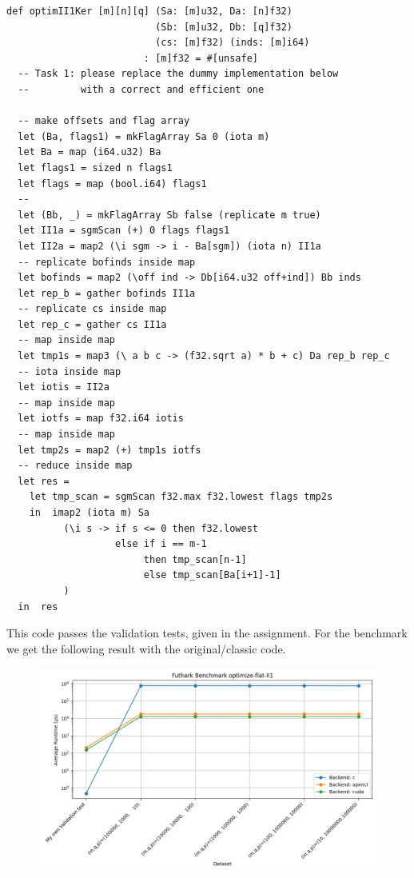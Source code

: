 \documentclass[a4paper,12pt]{article}
\begin{document}
\begin{lstlisting}
def optimII1Ker [m][n][q] (Sa: [m]u32, Da: [n]f32)
                          (Sb: [m]u32, Db: [q]f32)
                          (cs: [m]f32) (inds: [m]i64)
                        : [m]f32 = #[unsafe]
  -- Task 1: please replace the dummy implementation below
  --         with a correct and efficient one

  -- make offsets and flag array
  let (Ba, flags1) = mkFlagArray Sa 0 (iota m)
  let Ba = map (i64.u32) Ba
  let flags1 = sized n flags1
  let flags = map (bool.i64) flags1
  --
  let (Bb, _) = mkFlagArray Sb false (replicate m true)
  let II1a = sgmScan (+) 0 flags flags1
  let II2a = map2 (\i sgm -> i - Ba[sgm]) (iota n) II1a
  -- replicate bofinds inside map
  let bofinds = map2 (\off ind -> Db[i64.u32 off+ind]) Bb inds
  let rep_b = gather bofinds II1a
  -- replicate cs inside map
  let rep_c = gather cs II1a
  -- map inside map
  let tmp1s = map3 (\ a b c -> (f32.sqrt a) * b + c) Da rep_b rep_c
  -- iota inside map
  let iotis = II2a
  -- map inside map
  let iotfs = map f32.i64 iotis
  -- map inside map
  let tmp2s = map2 (+) tmp1s iotfs
  -- reduce inside map
  let res =
    let tmp_scan = sgmScan f32.max f32.lowest flags tmp2s
    in  imap2 (iota m) Sa
          (\i s -> if s <= 0 then f32.lowest
                   else if i == m-1
                        then tmp_scan[n-1]
                        else tmp_scan[Ba[i+1]-1]
          )
  in  res
\end{lstlisting}
This code passes the validation tests, given in the assignment. For the
benchmark we get the following result with the original/classic code.
\begin{figure}[H]
  \centering
  \includegraphics[width=\linewidth]{optimize-flat-II1benchmark_results.png}
\end{figure}
\end{document}
